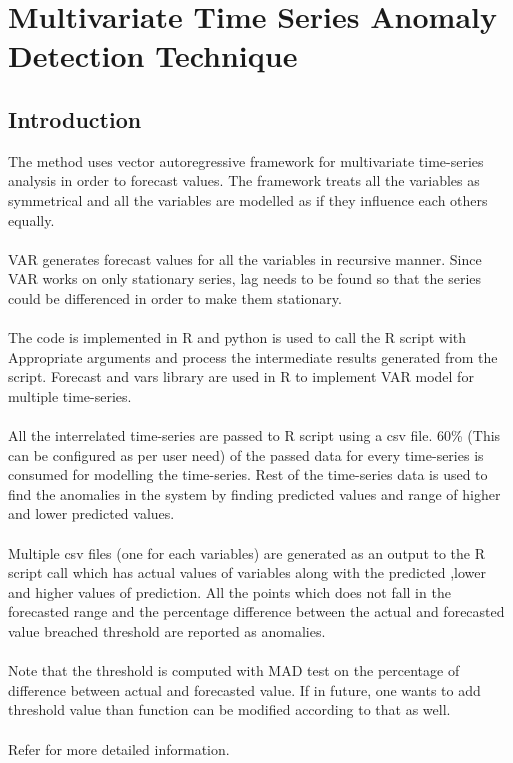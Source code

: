 \chapter{Multivariate Time Series Anomaly Detection Technique}
\label{appendix:multivariate}
\section{Introduction}

The method uses vector autoregressive framework for multivariate time-series analysis
in order to forecast values. The framework treats all the variables as symmetrical
and all the variables are modelled as if they influence each others equally.\\
\\
VAR generates forecast values for all the variables in recursive manner. Since VAR 
works on only stationary series, lag needs to be found so that the series could be
differenced in order to make them stationary.\\
\\
The code is implemented in R and python is used to call the R script with Appropriate 
arguments and process the intermediate results generated from the script. Forecast and 
vars library are used in R to implement VAR model for multiple time-series.\\
\\
All the interrelated time-series are passed to R script using a csv file. 60\% 
(This can be configured as per user need) of the passed data for every time-series 
is consumed for modelling the time-series. Rest of the time-series data is used to 
find the anomalies in the system by finding predicted values and range of higher and lower
predicted values.\\
\\
Multiple csv files (one for each variables) are generated as an output to the R script 
call which has actual values of variables along with the predicted ,lower and higher 
values of prediction. All the points which does not fall in the forecasted range and 
the percentage difference between the actual and forecasted value breached threshold 
are reported as anomalies.\\
\\
Note that the threshold is computed with MAD test on the percentage of difference between actual and forecasted value.
If in future, one wants to add threshold value than function can be modified according to that as well.\\
\\
Refer \cite{var} for more detailed information.


